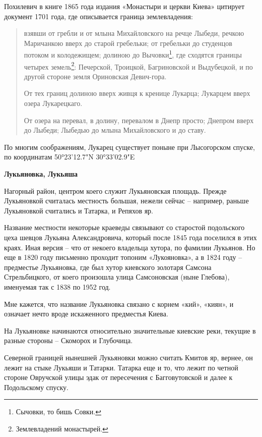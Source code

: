 Похилевич в книге 1865 года издания «Монастыри и церкви Киева» цитирует документ 1701 года, где описывается граница землевладения:

\begin{quotation}
взявши от гребли и от млына Михайловского на речце Лыбеди, речкою Маричанкою вверх до старой гребельки; от гребельки до студенцов потоком и колодежищем; долиною до Вычовки\footnote{Сычовки, то бишь Совки.}, где сходятся границы четырех земель\footnote{Землевладений монастырей.}: Печерской, Троицкой, Багриновской и Выдубецкой, и по другой стороне земля Ориновская Девич-гора. 

От тех границ долиною вверх живця к кренице Лукарца; Лукарцем вверх озера Лукарецкаго.

От озера на перевал, в долину, перевалом в Днепр просто; Днепром вверх до Лыбеди; Лыбедью до млына Михайловского и до ставу.
\end{quotation}

По многим соображениям, Лукарец существует поныне при Лысогорском спуске, по координатам 50°23'12.7"N 30°33'02.9"E\\

\newpage


\textbf{Лукьяновка, Лукьяша}

Нагорный район, центром коего служит Лукьяновская площадь. Прежде Лукьяновкой считалась местность большая, нежели сейчас – например, раньше Лукьяновкой считались и Татарка, и Репяхов яр. 

Название местности некоторые краеведы связывают со старостой подольского цеха шевцов Лукьяна Александровича, который после 1845 года поселился в этих краях. Иная версия – что от некоего владельца хутора, по фамилии Лукьянов. Но еще в 1820 году письменно проходит топоним «Лукояновка», а в 1824 году – предместье Лукьяновка, где был хутор киевского золотаря Самсона Стрельбицкого, от коего произошла улица Самсоновская (ныне Глебова), именуемая так с 1838 по 1952 год.

Мне кажется, что название Лукьяновка связано с корнем «кий», «киян», и означает нечто вроде искаженного предместья Киева.

На Лукьяновке начинаются относительно значительные киевские реки, текущие в разные стороны – Скоморох и Глубочица.

Северной границей нынешней Лукьяновки можно считать Кмитов яр, вернее, он лежит на стыке Лукьяши и Татарки. Татарка еще и то, что лежит по четной стороне Овручской улицы эдак от пересечения с Багговутовской и далее к Подольскому спуску.\\

